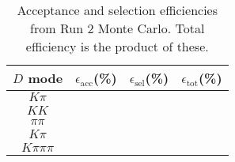 \begin{table}[H]
    \centering
    \begin{tabular}{cccc}
        \toprule
        $D$ mode & $\epsilon_\mathrm{acc}$(\%) &  $\epsilon_\mathrm{sel}$(\%) &  $\epsilon_\mathrm{tot}$(\%) \\
        \midrule
        $K\pi$ &  &  &  \\
        $KK$ &  &  &  \\
        $\pi\pi$ &  &  &  \\
        $K\pi$ &  &  &  \\
        $K\pi\pi\pi$ &  &  &  \\
        \bottomrule
    \end{tabular}
    \caption{Acceptance and selection efficiencies from  Run 2 Monte Carlo. Total efficiency is the  product of these.}
\label{tab:selection_efficiency_1}
\end{table}
